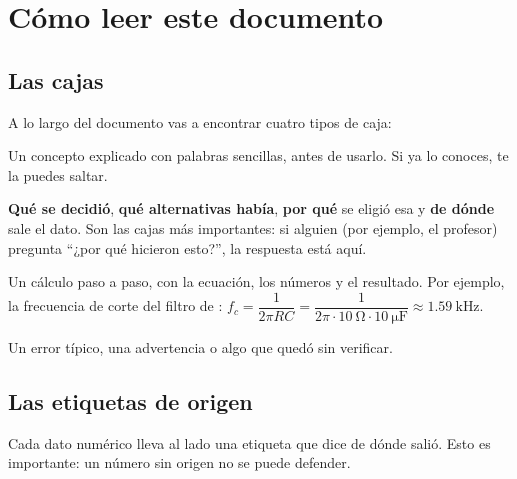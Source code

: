 \section{Cómo leer este documento}\label{sec:c01-leer}

\subsection*{Las cajas}
A lo largo del documento vas a encontrar cuatro tipos de caja:

\begin{idea}[ejemplo]
Un concepto explicado con palabras sencillas, antes de usarlo. Si ya lo conoces, te la puedes saltar.
\end{idea}

\begin{decision}[ejemplo]
\textbf{Qué se decidió}, \textbf{qué alternativas había}, \textbf{por qué} se eligió esa y \textbf{de dónde} sale el dato. Son las cajas más importantes: si alguien (por ejemplo, el profesor) pregunta ``¿por qué hicieron esto?'', la respuesta está aquí.
\end{decision}

\begin{calculo}[ejemplo]
Un cálculo paso a paso, con la ecuación, los números y el resultado. Por ejemplo, la frecuencia de corte del filtro de :
$f_c = \dfrac{1}{2\pi R C} = \dfrac{1}{2\pi\cdot\SI{10}{\ohm}\cdot\SI{10}{\micro\farad}} \approx \SI{1.59}{\kilo\hertz}$.
\end{calculo}

\begin{ojo}[ejemplo]
Un error típico, una advertencia o algo que quedó sin verificar.
\end{ojo}

\subsection*{Las etiquetas de origen}
Cada dato numérico lleva al lado una etiqueta que dice de dónde salió. Esto es importante: un número sin origen no se puede defender.

